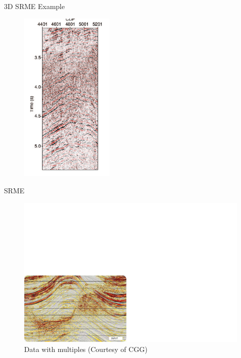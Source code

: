 \documentclass[xcolor=dvipsnames,notes]{beamer}
\begin{document}
\begin{frame}{3D SRME Example}
\begin{figure}
\includegraphics[width=0.4\textwidth]{Fig/fig8.png}
\end{figure}
\end{frame}
\begin{frame}{SRME}
\begin{figure}
\includegraphics[width=1.0\textwidth]{Fig/ch6-srme1.pdf}
\caption{Data with multiples (Courtesy of CGG)}
\end{figure}
\end{frame}
\end{document}
